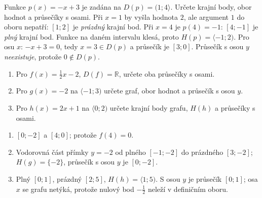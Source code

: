 \documentclass[11pt,a4paper]{article}
\begin{document}
\begin{prikladReseniBox}[title={Příklad 3}]
Funkce $p(x)=-x+3$ je zadána na $D(p)=(1;4\rangle$.
Určete krajní body, obor hodnot a průsečíky s osami.
\tcblower
Při $x=1$ by vyšla hodnota $2$, ale argument $1$ do oboru nepatří:
$[1;2]$ je \emph{prázdný} krajní bod. Při $x=4$ je $p(4)=-1$:
$[4;-1]$ je \emph{plný} krajní bod. Funkce na daném intervalu klesá,
proto $H(p)=\langle-1;2)$.
Pro osu $x$: $-x+3=0$, tedy $x=3\in D(p)$ a průsečík je $[3;0]$.
Průsečík s osou $y$ \emph{neexistuje}, protože $0\notin D(p)$.
\end{prikladReseniBox}
\begin{center}
\end{center}

\begin{zadaniReseniBox}[title={Samostatná práce 1}]
\begin{enumerate}[label=\alph*)]
\item Pro $f(x)=\tfrac12x-2$, $D(f)=\mathbb R$, určete oba průsečíky s osami.
\item Pro $g(x)=-2$ na $\langle-1;3)$ určete graf, obor hodnot a průsečík s osou $y$.
\item Pro $h(x)=2x+1$ na $\langle0;2)$ určete krajní body grafu, $H(h)$ a průsečíky s osami.
\end{enumerate}
\tcblower
\begin{enumerate}[label=\alph*)]
\item $[0;-2]$ a $[4;0]$; protože $f(4)=0$.
\item Vodorovná část přímky $y=-2$ od plného $[-1;-2]$ do prázdného $[3;-2]$;
$H(g)=\{-2\}$, průsečík s osou $y$ je $[0;-2]$.
\item Plný $[0;1]$, prázdný $[2;5]$, $H(h)=\langle1;5)$.
S osou $y$ je průsečík $[0;1]$; osa $x$ se grafu netýká,
protože nulový bod $-\tfrac12$ neleží v definičním oboru.
\end{enumerate}
\end{zadaniReseniBox}
\end{document}
